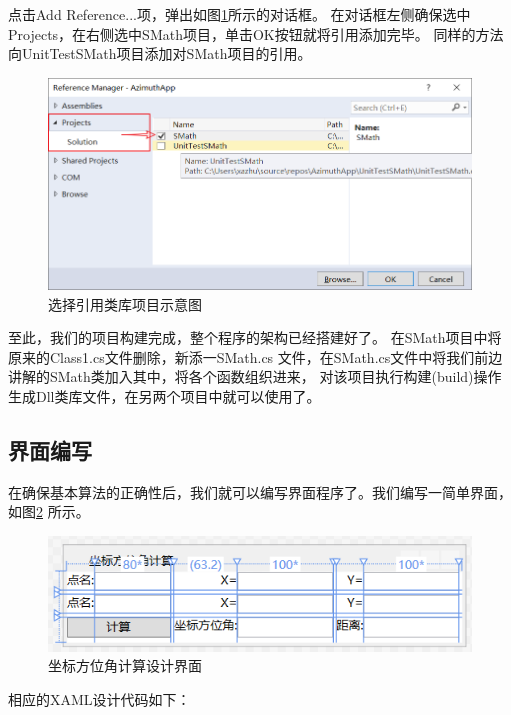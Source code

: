 点击Add Reference...项，弹出如图\ref{fig:AzimuthApp5}所示的对话框。
在对话框左侧确保选中Projects，在右侧选中SMath项目，单击OK按钮就将引用添加完毕。
同样的方法向UnitTestSMath项目添加对SMath项目的引用。
\begin{figure}[htbp]
\centering
\includegraphics[scale=0.7]{chapter/surveybase/AzimuthApp5.png}
\caption{选择引用类库项目示意图}
\label{fig:AzimuthApp5}
\end{figure}

至此，我们的项目构建完成，整个程序的架构已经搭建好了。
在SMath项目中将原来的Class1.cs文件删除，新添一SMath.cs
文件，在SMath.cs文件中将我们前边讲解的SMath类加入其中，将各个函数组织进来，
对该项目执行构建(build)操作生成Dll类库文件，在另两个项目中就可以使用了。

\subsection{界面编写}

在确保基本算法的正确性后，我们就可以编写界面程序了。我们编写一简单界面，如图\ref{fig:AzimuthUI1}
所示。

\begin{figure}[htbp]
\centering
\includegraphics[scale=1]{chapter/surveybase/AzimuthUI1.png}
\caption{坐标方位角计算设计界面}
\label{fig:AzimuthUI1}
\end{figure}

相应的XAML设计代码如下：


